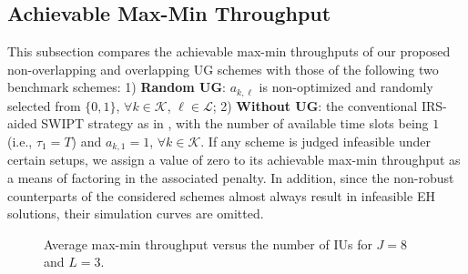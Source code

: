 \documentclass[12pt,draftclsnofoot, onecolumn]{IEEEtran}
\theoremstyle{plain}
\begin{document}
\begin{sloppypar}

\vspace{-1mm}
\subsection{Achievable Max-Min Throughput}
This subsection compares the achievable max-min throughputs of our proposed non-overlapping and overlapping UG schemes with those of the following two benchmark schemes: 1) \textbf{Random UG}: $a_{k,\ell}$ is non-optimized and randomly selected from $\{0,1\}$, $\forall k\in\mathcal K$, $\ell\in\mathcal L$;  %
2) \textbf{Without UG}: the conventional IRS-aided SWIPT strategy as in \cite{2020_Qingqing_SWIPT_letter,2020_Qingqing_SWIPT_QoS,2020_Cunhua_SWIPT,2020_Wei_SWIPT_secure,2021_Shayan_SWIPT}, with the number of available time slots being $1$ (i.e., $\tau_1 = T$) and $a_{k,1} = 1$, $\forall k\in\mathcal K$. If any scheme is judged infeasible under certain setups, we assign a value of zero to its achievable max-min throughput as a means of factoring in the associated penalty. In addition, since the non-robust counterparts of the considered schemes almost always result in infeasible EH solutions, their simulation curves are omitted. 

\begin{figure}[!t]
	\vspace{-3mm}
	\hspace{-4.5mm}
	\hspace{-8.5mm}
	\vspace{-1.4mm}
	\caption{Average max-min throughput versus the number of IUs for $J = 8$ and $L = 3$.}
	\label{fig:R_vs_IUs}
	\vspace{-4mm}
\end{figure}


\end{sloppypar}
\end{document}
